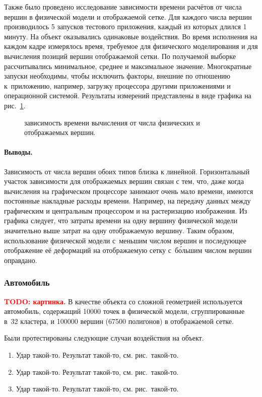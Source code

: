 \documentclass[a4paper, 14pt, titlepage]{extarticle}
\newcommand{\todo}[1]{\textbf{\textcolor{red}{TODO: #1}}}
\newcommand{\includefigure}[3][]{
    \begin{figure}[!htb]
      \center{\texttt{[image: \#2]}}
      \caption{#3} \label{fig:#2}
    \end{figure}
  }
\begin{document}
        Также было проведено исследование зависимости времени расчётов от числа вершин в физической
        модели и отображаемой сетке. Для каждого числа вершин производилось 5 запусков тестового
        приложения, каждый из которых длился 1 минуту. На объект оказывались одинаковые воздействия. Во время
        исполнения на каждом кадре измерялось время, требуемое для физического моделирования и для
        вычисления позиций вершин отображаемой сетки. По получаемой выборке рассчитывались
        минимальное, среднее и максимальное значение. Многократные запуски необходимы, чтобы исключить
        факторы, внешние по отношению к~приложению, например, загрузку процессора другими приложениями
        и операционной системой. Результаты измерений представлены в виде графика на рис.~\ref{fig:time-plot}.

        \includefigure[width=1\linewidth]{time-plot}{зависимость времени вычисления от числа физических и отображаемых вершин.}

        \paragraph{Выводы.} Зависимость от числа вершин обоих типов близка к линейной.
        Горизонтальный участок зависимости для отображаемых вершин связан с тем, что, даже когда
        вычисления на графическом процессоре занимают очень мало времени, имеются
        постоянные накладные расходы времени. Например, на передачу данных между графическим и центральным
        процессором и на растеризацию изображения. Из графика следует, что затраты времени на
        одну вершину физической модели значительно выше затрат на одну отображаемую вершину. Таким
        образом, использование физической модели с~меньшим числом вершин и последующее отображение
        её деформаций на отображаемую сетку с~б\'{о}льшим числом вершин оправдано.

      \subsubsection{Автомобиль}

        \todo{картинка.} В качестве объекта со сложной геометрией используется автомобиль, содержащий
        10000 точек в физической модели, сгруппированные в~32 кластера, и 100000 вершин (67500
        полигонов) в отображаемой сетке.

        Были протестированы следующие случаи воздействия на объект.
        \begin{enumerate}
          \item Удар такой-то. Результат такой-то, см. рис.~такой-то.
          \item Удар такой-то. Результат такой-то, см. рис.~такой-то.
          \item Удар такой-то. Результат такой-то, см. рис.~такой-то.
        \end{enumerate}
\end{document}
